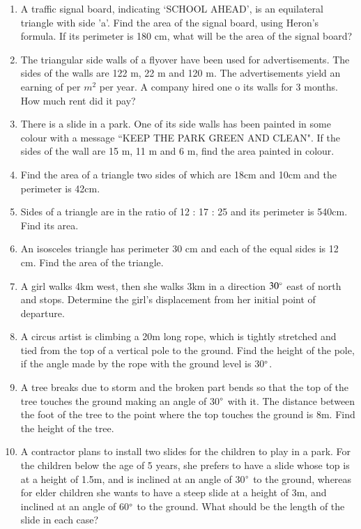 \begin{enumerate}[label=\arabic*.,ref=\thesubsection.\theenumi]
\item A traffic signal board, indicating ‘SCHOOL AHEAD’, is an equilateral triangle with side 'a'. Find the area of the signal board, using Heron's formula. If its perimeter is 180 cm, what will be the area of the signal board?
\item The triangular side walls of a flyover have been used for advertisements. The sides of the walls are 122 m, 22 m and 120 m. The advertisements yield an earning of  per $m^2$ per year.  A company hired one o its walls for 3 months. How  much rent did it pay?
\item There is a slide in a park. One of its side walls has been painted in some colour with a message ``KEEP THE PARK GREEN AND CLEAN". If the sides of the wall are 15 m, 11 m and 6 m, find the area painted in colour.
\item Find the area of a triangle two sides of which are 18cm and 10cm and the perimeter is 42cm.
\item Sides of a triangle are in the ratio of 12 : 17 : 25 and its perimeter is 540cm. Find its area. 
\item  An isosceles triangle has perimeter 30 cm and each of the equal sides is 12 cm. Find the area of the triangle.
\item A girl walks 4km west, then she walks 3km in a direction $30\degree$ east of north and stops.  Determine the girl's displacement from her initial point of departure.
%
\item A circus artist is climbing a 20m long rope, which is tightly stretched and tied from the top of a vertical pole to the ground.  Find the height of the pole, if the angle made by the rope with the ground level is 30$\degree$.
%
\item A tree breaks due to storm and the broken part bends so that the top of the tree touches the ground making an angle of 30$\degree$ with it.  The distance between the foot of the tree to the point where the top touches the ground is 8m.  Find the height of the tree.
%
\item A contractor plans to install two slides for the children to play in a park.  For the children below the age of 5 years, she prefers to have a slide whose top is at a height of 1.5m, and is inclined at an angle of 30$\degree$  to the ground, whereas for elder children she wants to have a steep slide at a height of 3m, and inclined at an angle of 60$\degree$ to the ground.  What should be the length of the slide in each case?

\end{enumerate}
